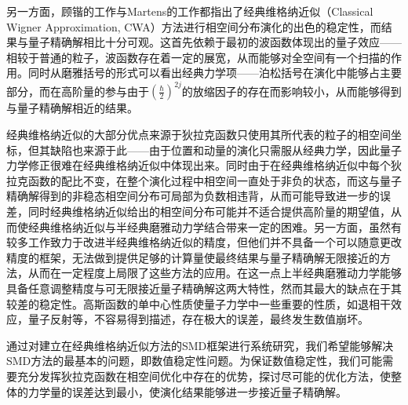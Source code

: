 另一方面，顾锴的工作与Martens的工作都指出了经典维格纳近似（Classical Wigner Approximation, CWA）方法进行相空间分布演化的出色的稳定性，而结果与量子精确解相比十分可观\cite{kaiguPSQHD,donoso2000simulation}。这首先依赖于最初的波函数体现出的量子效应——相较于普通的粒子，波函数存在着一定的展宽，从而能够对全空间有一个扫描的作用。同时从磨雅括号的形式可以看出经典力学项——泊松括号在演化中能够占主要部分，而在高阶量的参与由于$\left(\frac{\hbar}{2}\right)^{2j}$的放缩因子的存在而影响较小，从而能够得到与量子精确解相近的结果。

经典维格纳近似的大部分优点来源于狄拉克函数只使用其所代表的粒子的相空间坐标，但其缺陷也来源于此——由于位置和动量的演化只需服从经典力学，因此量子力学修正很难在经典维格纳近似中体现出来。同时由于在经典维格纳近似中每个狄拉克函数的配比不变，在整个演化过程中相空间一直处于非负的状态，而这与量子精确解得到的非稳态相空间分布可局部为负数相违背\cite{heller1976wigner}，从而可能导致进一步的误差，同时经典维格纳近似给出的相空间分布可能并不适合提供高阶量的期望值，从而使经典维格纳近似与半经典磨雅动力学结合带来一定的困难。另一方面，虽然有较多工作致力于改进半经典维格纳近似的精度\cite{heller1976wigner,liu2007real}，但他们并不具备一个可以随意更改精度的框架，无法做到提供足够的计算量使最终结果与量子精确解无限接近的方法，从而在一定程度上局限了这些方法的应用。在这一点上半经典磨雅动力学能够具备任意调整精度与可无限接近量子精确解这两大特性，然而其最大的缺点在于其较差的稳定性\cite{YifanShenPSQHD,kaiguPSQHD}。高斯函数的单中心性质使量子力学中一些重要的性质，如退相干效应，量子反射等，不容易得到描述，存在极大的误差，最终发生数值崩坏。

通过对建立在经典维格纳近似方法的SMD框架进行系统研究，我们希望能够解决SMD方法的最基本的问题，即数值稳定性问题。为保证数值稳定性，我们可能需要充分发挥狄拉克函数在相空间优化中存在的优势，探讨尽可能的优化方法，使整体的力学量的误差达到最小，使演化结果能够进一步接近量子精确解。


